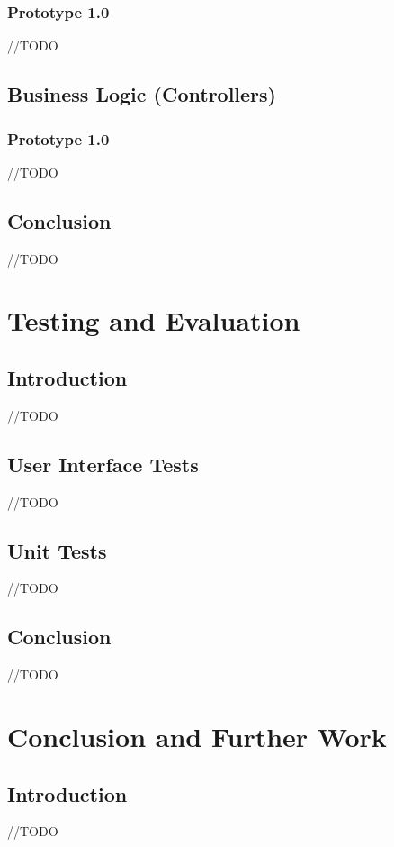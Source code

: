 \documentclass[12pt,twoside,a4paper]{report}
\begin{document}
\subsection{Prototype 1.0}\label{4.3.1}
//TODO

\section{Business Logic (Controllers)}\label{4.3}
\subsection{Prototype 1.0}\label{4.3.1}
//TODO

\section{Conclusion}\label{4.3}
//TODO

\chapter{Testing and Evaluation}\label{5}
\section{Introduction}\label{5.1}
//TODO

\section{User Interface Tests}\label{5.3}
//TODO

\section{Unit Tests}\label{5.2}
//TODO

\section{Conclusion}\label{5.4}
//TODO

\chapter{Conclusion and Further Work}\label{6}

\section{Introduction}\label{6.1}
//TODO
\end{document}
